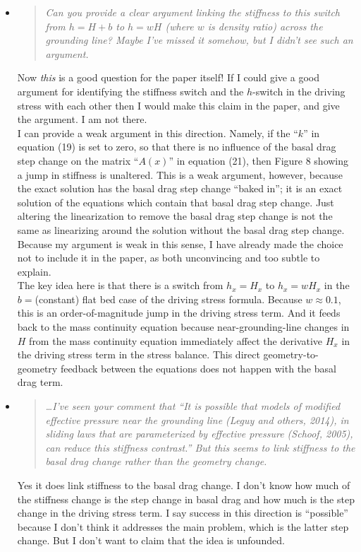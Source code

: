 \documentclass[11pt,reqno]{amsart}
\newcommand{\reply}[2]{
\medskip\medskip
\item  \begin{quote}
\emph{#1}
\end{quote}

\medskip
\noindent #2}
\begin{document}
\begin{itemize}
\reply{Can you provide a clear argument linking the stiffness to this switch from $h = H+b$ to $h = wH$ (where $w$ is density ratio) across the grounding line?  Maybe I've missed it somehow, but I didn't see such an argument.}
{Now \emph{this} is a good question for the paper itself!  If I could give a good argument for identifying the stiffness switch and the $h$-switch in the driving stress with each other then I would make this claim in the paper, and give the argument.  I am not there. \medskip \\
I can provide a weak argument in this direction.  Namely, if the ``$k$'' in equation (19) is set to zero, so that there is no influence of the basal drag step change on the matrix ``$A(x)$'' in equation (21), then Figure 8 showing a jump in stiffness is unaltered.  This is a weak argument, however, because the exact solution has the basal drag step change ``baked in''; it is an exact solution of the equations which contain that basal drag step change.  Just altering the linearization to remove the basal drag step change is not the same as linearizing around the solution without the basal drag step change. Because my argument is weak in this sense, I have already made the choice not to include it in the paper, as both unconvincing and too subtle to explain. \medskip \\
The key idea here is that there is a switch from $h_x = H_x$ to $h_x = w H_x$ in the $b=$(constant) flat bed case of the driving stress formula.  Because $w \approx 0.1$, this is an order-of-magnitude jump in the driving stress term.  And it feeds back to the mass continuity equation because near-grounding-line changes in $H$ from the mass continuity equation immediately affect the derivative $H_x$ in the driving stress term in the stress balance.  This direct geometry-to-geometry feedback between the equations does not happen with the basal drag term.}

\reply{\dots I've seen your comment that ``It is possible that models of modified effective pressure near the grounding line (Leguy and others, 2014), in sliding laws that are parameterized by effective pressure (Schoof, 2005), can reduce this stiffness contrast.''  But this seems to link stiffness to the basal drag change rather than the geometry change.}
{Yes it does link stiffness to the basal drag change.  I don't know how much of the stiffness change is the step change in basal drag and how much is the step change in the driving stress term.  I say success in this direction is ``possible'' because I don't think it addresses the main problem, which is the latter step change.  But I don't want to claim that the idea is unfounded.}


\end{itemize}
\end{document}
